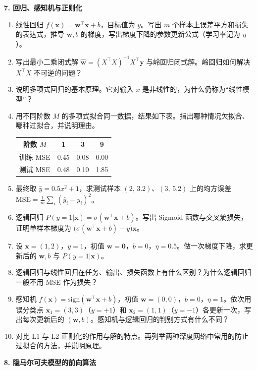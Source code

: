 \bigskip
\noindent\textbf{7. 回归、感知机与正则化}
\begin{enumerate}[label=(\arabic*)]
\item 线性回归 $f(\bm x)=\bm w^\top\bm x+b$，目标值为 $y$。写出 $m$ 个样本上误差平方和损失的表达式，推导 $\bm w,b$ 的梯度，写出梯度下降的参数更新公式（学习率记为 $\eta$）。
\item 写出最小二乘闭式解 $\hat{\bm w}=(X^\top X)^{-1}X^\top\bm y$ 与岭回归闭式解。岭回归如何解决 $X^\top X$ 不可逆的问题？
\item 说明多项式回归的基本原理。它对输入 $x$ 是非线性的，为什么仍称为“线性模型”？
\item 用不同阶数 $M$ 的多项式拟合同一数据，结果如下表。指出哪种情况欠拟合、哪种过拟合，并说明理由。
\begin{center}
\begin{tabular}{cccc}
\toprule
阶数 $M$ & 1 & 3 & 9\\ \midrule
训练 MSE & 0.45 & 0.08 & 0.00\\
测试 MSE & 0.48 & 0.10 & 1.85\\
\bottomrule
\end{tabular}
\end{center}
\item 最终取 $\hat y=0.5x^2+1$，求测试样本 $(2,\,3.2)$、$(3,\,5.2)$ 上的均方误差 $\mathrm{MSE}=\frac1m\sum_i(\hat y_i-y_i)^2$。
\item 逻辑回归 $P(y=1|\bm x)=\sigma(\bm w^\top\bm x+b)$。写出 Sigmoid 函数与交叉熵损失，证明单样本梯度为 $\big(\sigma(\bm w^\top\bm x+b)-y\big)\bm x$。
\item 设 $\bm x=(1,2)$，$y=1$，初值 $\bm w=\bm 0$，$b=0$，$\eta=0.5$。做一次梯度下降，求更新后的 $\bm w,b$ 与 $P(y=1|\bm x)$。
\item 逻辑回归与线性回归在任务、输出、损失函数上有什么区别？为什么逻辑回归一般不用 MSE 作为损失？
\item 感知机 $f(\bm x)=\mathrm{sign}(\bm w^\top\bm x+b)$，初值 $\bm w=(0,0)$，$b=0$，$\eta=1$。依次用误分类点 $\bm x_1=(3,3)$（$y=+1$）和 $\bm x_2=(1,1)$（$y=-1$）各更新一次，写出每次更新后的 $(\bm w,b)$。感知机与逻辑回归的判别方式有什么不同？
\item 对比 L1 与 L2 正则化的作用与解的特点。再列举两种深度网络中常用的防止过拟合的方法，并说明原理。
\end{enumerate}

\bigskip
\noindent\textbf{8. 隐马尔可夫模型的前向算法}

